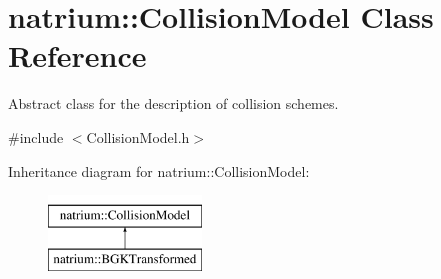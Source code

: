 \hypertarget{classnatrium_1_1CollisionModel}{\section{natrium\-:\-:\-Collision\-Model \-Class \-Reference}
\label{classnatrium_1_1CollisionModel}
}


\-Abstract class for the description of collision schemes.  




{\ttfamily \#include $<$\-Collision\-Model.\-h$>$}

\-Inheritance diagram for natrium\-:\-:\-Collision\-Model\-:\begin{figure}[H]
\begin{center}
\leavevmode
\includegraphics[height=2.000000cm]{classnatrium_1_1CollisionModel}
\end{center}
\end{figure}
